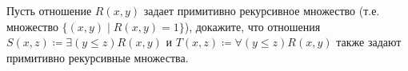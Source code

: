 Пусть отношение $R(x, y)$ задает примитивно рекурсивное множество (т.е. множество
$\{(x, y) \mid R(x, y) = 1\}$), докажите, что отношения $S(x, z) \coloneqq \exists (y \le z) R(x, y)$ и
$T(x, z) \coloneqq \forall (y \le z) R(x, y)$ также задают примитивно рекурсивные множества.
